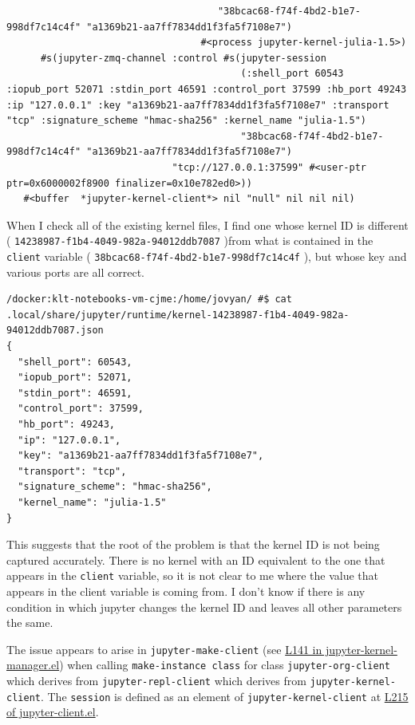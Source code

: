 \documentclass[11pt]{article}
\begin{document}
\begin{enumerate}
\begin{verbatim}
                                     "38bcac68-f74f-4bd2-b1e7-998df7c14c4f" "a1369b21-aa7ff7834dd1f3fa5f7108e7")
                                  #<process jupyter-kernel-julia-1.5>)
      #s(jupyter-zmq-channel :control #s(jupyter-session
                                         (:shell_port 60543 :iopub_port 52071 :stdin_port 46591 :control_port 37599 :hb_port 49243 :ip "127.0.0.1" :key "a1369b21-aa7ff7834dd1f3fa5f7108e7" :transport "tcp" :signature_scheme "hmac-sha256" :kernel_name "julia-1.5")
                                         "38bcac68-f74f-4bd2-b1e7-998df7c14c4f" "a1369b21-aa7ff7834dd1f3fa5f7108e7")
                             "tcp://127.0.0.1:37599" #<user-ptr ptr=0x6000002f8900 finalizer=0x10e782ed0>))
   #<buffer  *jupyter-kernel-client*> nil "null" nil nil nil)
\end{verbatim}

When I check all of the existing kernel files, I find one whose kernel ID is different ( \texttt{14238987-f1b4-4049-982a-94012ddb7087} )from what is contained in the \texttt{client} variable ( \texttt{38bcac68-f74f-4bd2-b1e7-998df7c14c4f} ), but whose key and various ports are all correct.

\begin{verbatim}
/docker:klt-notebooks-vm-cjme:/home/jovyan/ #$ cat .local/share/jupyter/runtime/kernel-14238987-f1b4-4049-982a-94012ddb7087.json
{
  "shell_port": 60543,
  "iopub_port": 52071,
  "stdin_port": 46591,
  "control_port": 37599,
  "hb_port": 49243,
  "ip": "127.0.0.1",
  "key": "a1369b21-aa7ff7834dd1f3fa5f7108e7",
  "transport": "tcp",
  "signature_scheme": "hmac-sha256",
  "kernel_name": "julia-1.5"
}
\end{verbatim}

This suggests that the root of the problem is that the kernel ID is not being captured accurately. There is no kernel with an ID equivalent to the one that appears in the \texttt{client} variable, so it is not clear to me where the value that appears in the client variable is coming from. I don't know if there is any condition in which jupyter changes the kernel ID and leaves all other parameters the same.

The issue appears to arise in \texttt{jupyter-make-client} (see \href{https://github.com/nnicandro/emacs-jupyter/blob/a9ae0bcef52a62cf7df520756d994162a0570156/jupyter-kernel-manager.el\#L141}{L141 in jupyter-kernel-manager.el}) when calling \texttt{make-instance class} for class \texttt{jupyter-org-client} which derives from \texttt{jupyter-repl-client} which derives from \texttt{jupyter-kernel-client}. The \texttt{session} is defined as an element of \texttt{jupyter-kernel-client} at \href{https://github.com/nnicandro/emacs-jupyter/blob/403c70c83cb3754c83da0932b0efaf5e72bdca9a/jupyter-client.el\#L215}{L215 of jupyter-client.el}.
\end{enumerate}
\end{document}
